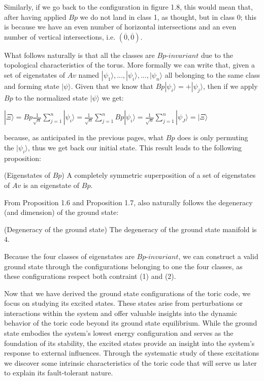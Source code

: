 \documentclass{Configuration_Files/PoliMi3i_thesis}
\begin{document}
Similarly, if we go back to the configuration in figure 1.8, this would mean that, after having applied $Bp$ we do not land in class 1, as thought, but in class 0; this is because we have an even number of horizontal intersections and an even number of vertical intersections, i.e.   $(\overline{0}, \overline{0})$.

What follows naturally is that all the classes are $Bp$-$invariant$ due to the topological characteristics of the torus. More formally we can write that, given a set of eigenstates of $Av$ named $|\psi_1\rangle,...,|\psi_i\rangle,...,|\psi_n\rangle$ all belonging to the same class and forming state $|\psi\rangle$. Given that we know that $Bp|\psi_i\rangle=+|\psi_j\rangle$, then if we apply $Bp$ to the normalized state $|\psi\rangle$ we get:

\begin{center}
	$|\Xi\rangle= Bp \frac{1}{\sqrt{n}} \sum_{j=1}^{n} |\psi_i\rangle = \frac{1}{\sqrt{n}} \sum_{j=1}^{n} Bp |\psi_i\rangle = \frac{1}{\sqrt{n}} \sum_{j=1}^{n} |\psi_J\rangle =|\Xi\rangle$
\end{center}

because, as anticipated in the previous pages, what $Bp$ does is only permuting the $|\psi_i\rangle$, thus we get back our initial state. This result leads to the following proposition:

\begin{proposition}(Eigenstates of $Bp$) A completely symmetric superposition of a set of eigenstates of $Av$ is an eigenstate of $Bp$.
\end{proposition}

From Proposition 1.6 and Proposition 1.7, also naturally follows the degeneracy (and dimension) of the ground state: \newline

\begin{proposition} (Degeneracy of the ground state) The degeneracy of the ground state manifold is $4$. 
\end{proposition}

Because the four classes of eigenstates are $Bp$-$invariant$, we can construct a valid ground state through the configurations belonging to one the four classes, as these configurations respect both contraint (1) and (2).\newline 

Now that we have derived the ground state configurations of the toric code, we focus on studying its excited states. These states arise from perturbations or interactions within the system and offer valuable insights into the dynamic behavior of the toric code beyond its ground state equilibrium. While the ground state embodies the system's lowest energy configuration and serves as the foundation of its stability, the excited states provide an insight into the system's response to external influences. 
Through the systematic study of these excitations we discover some intrinsic characteristics of the toric code that will serve us later to explain its fault-tolerant nature.
\end{document}
